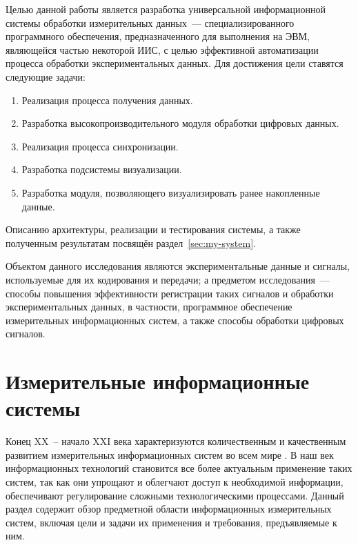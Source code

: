 \documentclass[a4paper, 14pt, titlepage]{extarticle}
\let\oldsection\section
\renewcommand{\section}{\newpage\oldsection}
\begin{document}
  Целью данной работы является разработка универсальной информационной системы обработки
  измерительных данных~--- специализированного программного обеспечения, предназначенного для
  выполнения на ЭВМ, являющейся частью некоторой ИИС, с целью эффективной автоматизации процесса
  обработки экспериментальных данных. Для достижения цели ставятся следующие задачи:
  \begin{enumerate}
    \item Реализация процесса получения данных.
    \item Разработка высокопроизводительного модуля обработки цифровых данных.
    \item Реализация процесса синхронизации.
    \item Разработка подсистемы визуализации.
    \item Разработка модуля, позволяющего визуализировать ранее накопленные данные.
  \end{enumerate}
  Описанию архитектуры, реализации и тестирования системы, а также полученным результатам посвящён раздел~\ref{sec:my-system}.

  Объектом данного исследования являются экспериментальные данные и сигналы, используемые для их
  кодирования и передачи; а предметом исследования~--- способы повышения эффективности регистрации
  таких сигналов и обработки экспериментальных данных, в частности, программное обеспечение
  измерительных информационных систем, а также способы обработки цифровых сигналов.


  \section{Измерительные информационные системы}\label{sec:iis}


  Конец XX~-- начало XXI века характеризуются количественным и качественным развитием измерительных
  информационных систем во всем мире \cite[с.~3]{rannev-iis}. В наш век информационных
  технологий становится все более актуальным применение таких систем, так как они упрощают и облегчают доступ
  к необходимой информации, обеспечивают регулирование сложными технологическими процессами.
  Данный раздел содержит обзор предметной области информационных измерительных систем, включая цели
  и задачи их применения и требования, предъявляемые к ним.
\end{document}
